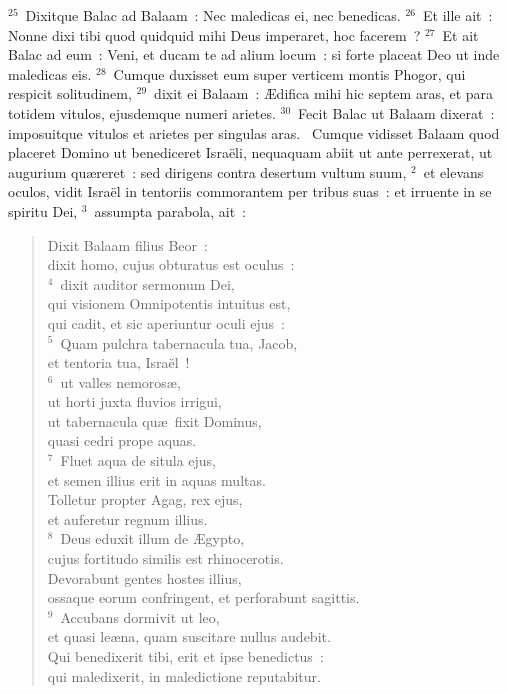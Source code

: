 ${}^{25}$~Dixitque Balac ad Balaam~: Nec maledicas ei, nec benedicas.
${}^{26}$~Et ille ait~: Nonne dixi tibi quod quidquid mihi Deus imperaret, hoc facerem~?
${}^{27}$~Et ait Balac ad eum~: Veni, et ducam te ad alium locum~: si forte placeat Deo ut inde maledicas eis.
${}^{28}$~Cumque duxisset eum super verticem montis Phogor, qui respicit solitudinem,
${}^{29}$~dixit ei Balaam~: \AE difica mihi hic septem aras, et para totidem vitulos, ejusdemque numeri arietes.
${}^{30}$~Fecit Balac ut Balaam dixerat~: imposuitque vitulos et arietes per singulas aras.
~Cumque vidisset Balaam quod placeret Domino ut benediceret Isra\"eli, nequaquam abiit ut ante perrexerat, ut augurium qu\ae reret~: sed dirigens contra desertum vultum suum,
${}^{2}$~et elevans oculos, vidit Isra\"el in tentoriis commorantem per tribus suas~: et irruente in se spiritu Dei,
${}^{3}$~assumpta parabola, ait~: \begin{flushleft}\begin{verse}Dixit Balaam filius Beor~:\\ dixit homo, cujus obturatus est oculus~:\\
${}^{4}$~dixit auditor sermonum Dei,\\ qui visionem Omnipotentis intuitus est,\\ qui cadit, et sic aperiuntur oculi ejus~:\\
${}^{5}$~Quam pulchra tabernacula tua, Jacob,\\ et tentoria tua, Isra\"el~!\\
${}^{6}$~ut valles nemoros\ae ,\\ ut horti juxta fluvios irrigui,\\ ut tabernacula qu\ae\ fixit Dominus,\\ quasi cedri prope aquas.\\
${}^{7}$~Fluet aqua de situla ejus,\\ et semen illius erit in aquas multas.\\ Tolletur propter Agag, rex ejus,\\ et auferetur regnum illius.\\
${}^{8}$~Deus eduxit illum de \AE gypto,\\ cujus fortitudo similis est rhinocerotis.\\ Devorabunt gentes hostes illius,\\ ossaque eorum confringent, et perforabunt sagittis.\\
${}^{9}$~Accubans dormivit ut leo,\\ et quasi le\ae na, quam suscitare nullus audebit.\\ Qui benedixerit tibi, erit et ipse benedictus~:\\ qui maledixerit, in maledictione reputabitur.\end{verse}\end{flushleft}


